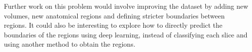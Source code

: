 Further work on this problem would involve improving the dataset by adding new volumes, new anatomical regions and defining stricter boundaries between regions. It could also be interesting to explore how to directly predict the boundaries of the regions using deep learning, instead of classifying each slice and using another method to obtain the regions. 


